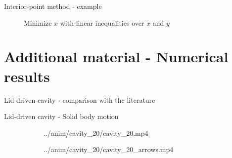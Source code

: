 \documentclass{beamer}  %
\begin{document}
\begin{frame}{Interior-point method - example}
    \begin{figure}
        \centering
        \caption*{Minimize $x$ with linear inequalities over $x$ and $y$}
    \end{figure}
\end{frame}

\section*{Additional material - Numerical results}

\begin{frame}{Lid-driven cavity - comparison with the literature}
    \begin{figure}
        \centering
        
    \end{figure}
\end{frame}

\begin{frame}{Lid-driven cavity - Solid body motion}
    \begin{figure}
        \centering
        \begin{subfigure}[t]{0.48\textwidth}
            \movie[width=\textwidth, height=1.042\textwidth, autostart, loop]{} {../anim/cavity_20/cavity_20.mp4}
        \end{subfigure}
        \begin{subfigure}[t]{0.48\textwidth}
            \movie[width=\textwidth, height=1.042\textwidth, autostart, loop]{} {../anim/cavity_20/cavity_20_arrows.mp4}
        \end{subfigure}
    \end{figure}
\end{frame}
\end{document}

